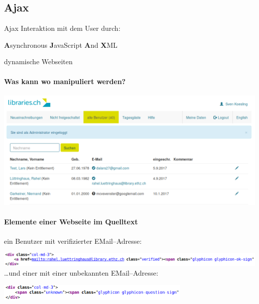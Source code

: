 \subsection{Ajax}
\begin{frame}{Ajax}
  Interaktion mit dem User durch:
  \begin{center}
    \textbf{A}synchronous \textbf{J}avaScript \textbf{A}nd \textbf{X}ML
  \end{center}
\end{frame}


%
\begin{frame}{dynamische Webseiten}
\framesubtitle{Was kann wo manipuliert werden?}
  \begin{center}
    \includegraphics[height=0.7\textheight]{pics/ajax-pidp.png}
  \end{center}
\end{frame}

\begin{frame}{}
\framesubtitle{Elemente einer Webseite im Quelltext}
  ein Benutzer mit verifizierter EMail--Adresse:

  \includegraphics[width=1\textwidth]{pics/class-verified.png}
  \ldots und einer mit einer unbekannten EMail--Adresse:
  
  \includegraphics[width=0.7\textwidth]{pics/class-unknown.png}
\end{frame}


